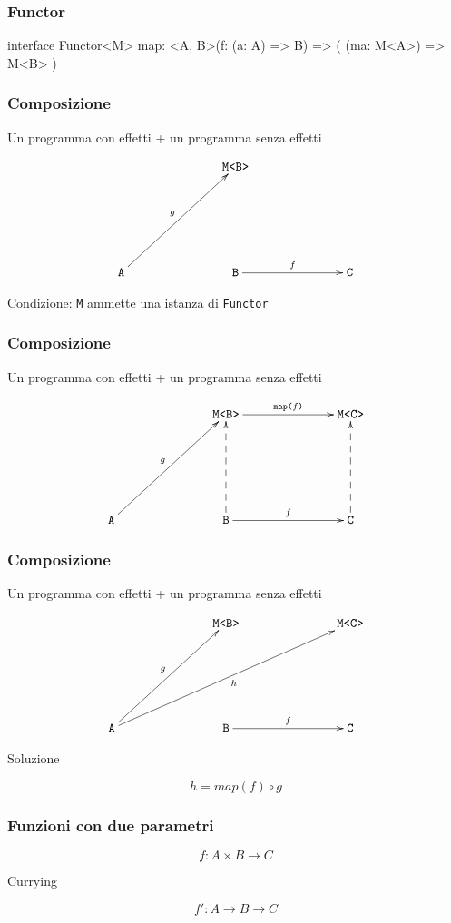 \documentclass{beamer}
\newenvironment{code}
  {\vspace{0.5cm} \VerbatimEnvironment\begin{typescriptcode}}
  {\end{typescriptcode} \vspace{0.2cm}}
\begin{document}
\begin{frame}[fragile]
\frametitle{Functor}

\begin{code}
interface Functor<M> {
  map: <A, B>(f: (a: A) => B) => ( (ma: M<A>) => M<B> )
}
\end{code}

\end{frame}

\begin{frame}
\frametitle{Composizione}

Un programma con effetti + un programma senza effetti

\[
\xymatrixrowsep{2.5cm}
\xymatrixcolsep{2.5cm}
\xymatrix{
  & \texttt{M<B>} \\
  \texttt{A} \ar[ur]^{g} & \texttt{B} \ar[r]^{f} & \texttt{C}
}
\]

Condizione: \texttt{M} ammette una istanza di \texttt{Functor}

\end{frame}

\begin{frame}
\frametitle{Composizione}

Un programma con effetti + un programma senza effetti

\[
\xymatrixrowsep{2.5cm}
\xymatrixcolsep{2.5cm}
\xymatrix{
  & \texttt{M<B>} \ar[r]^{\texttt{map(}f\texttt{)}} & \texttt{M<C>}  \\
  \texttt{A} \ar[ur]^{g} & \texttt{B} \ar@{-->}[u] \ar[r]^{f} & \texttt{C} \ar@{-->}[u]
}
\]

\end{frame}

\begin{frame}
\frametitle{Composizione}

Un programma con effetti + un programma senza effetti

\[
\xymatrixrowsep{2.5cm}
\xymatrixcolsep{2.5cm}
\xymatrix{
  & \texttt{M<B>} & \texttt{M<C>}  \\
  \texttt{A} \ar[ur]^{g} \ar[urr]_{h} & \texttt{B} \ar[r]^{f} & \texttt{C}
}
\]

Soluzione

$$
h = map(f) \circ g
$$

\end{frame}

\begin{frame}
\frametitle{Funzioni con due parametri}

$$
f: A \times B \rightarrow C
$$

Currying

$$
f': A \rightarrow B \rightarrow C
$$

\end{frame}
\end{document}
